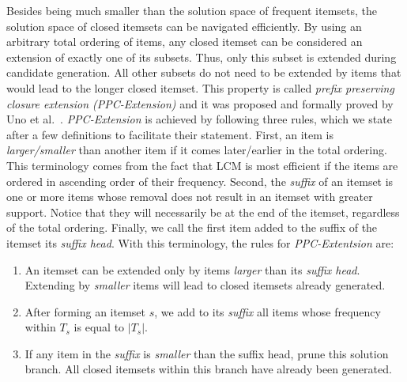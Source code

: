 \documentclass{sig-alternate}
\begin{document}
Besides being much smaller than the solution space of frequent itemsets,
the solution space of closed itemsets can be navigated efficiently.
By using an arbitrary total ordering of items, any closed itemset can be
considered an extension of exactly one of its subsets.
Thus, only this subset is extended during candidate generation.
All other subsets do not need to be extended by items that would lead to
the longer closed itemset.
This property is called \emph{prefix preserving closure extension
(PPC-Extension)} and it was proposed and formally proved by
Uno et al.~\cite{uno2004lcm}.
\emph{PPC-Extension} is achieved by following three rules, which we state
after a few definitions to facilitate their statement.
First, an item is \emph{larger/smaller} than another item if it comes
later/earlier in the total ordering.
This terminology comes from the fact that LCM is most efficient if the items
are ordered in ascending order of their frequency.
Second, the \emph{suffix} of an itemset is one or more items whose removal
does not result in an itemset with greater support.
Notice that they will necessarily be at the end of the itemset,
regardless of the total ordering.
Finally, we call the first item added to the suffix of the itemset its
\emph{suffix head}.
With this terminology, the rules for \emph{PPC-Extentsion} are:
\begin{enumerate}
\item An itemset can be extended only by items \emph{larger} than its \emph{suffix head}. Extending by \emph{smaller} items will lead to closed itemsets already generated.
\item After forming an itemset $s$, we add to its \emph{suffix} all items whose frequency within $T_s$ is equal to $|T_s|$.
\item If any item in the \emph{suffix} is \emph{smaller} than the suffix head, prune this solution branch. All closed itemsets within this branch have already been generated.
\end{enumerate}
 
\end{document}
